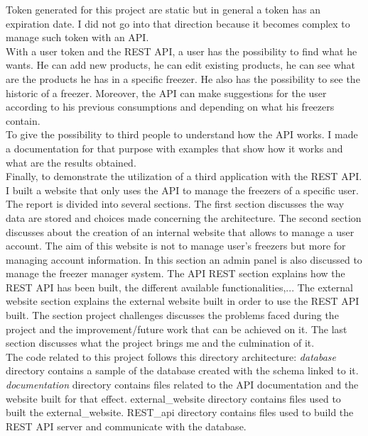 Token generated for this project are static but in general a token has an expiration date. I did not go into that direction because it becomes complex to manage such token with an API.\\

With a user token and the REST API, a user has the possibility to find what he wants. He can add new products, he can edit existing products, he can see what are the products he has in a specific freezer. He also has the possibility to see the historic of a freezer. Moreover, the API can make suggestions for the user according to his previous consumptions and depending on what his freezers contain.\\

To give the possibility to third people to understand how the API works. I made a documentation for that purpose with examples that show how it works and what are the results obtained. \\

Finally, to demonstrate the utilization of a third application with the REST API. I built a website that only uses the API to manage the freezers of a specific user.\\

The report is divided into several sections. The first section discusses the way data are stored and choices made concerning the architecture. The second section discusses about the creation of an internal website that allows to manage a user account. The aim of this website is not to manage user's freezers but more for managing account information. In this section an admin panel is also discussed to manage the freezer manager system. The API REST section explains how the REST API has been built, the different available functionalities,... The external website section explains the external website built in order to use the REST API built. The section project challenges discusses the problems faced during the project and the improvement/future work that can be achieved on it. The last section discusses what the project brings me and the culmination of it.\\

The code related to this project follows this directory architecture:
\textit{database} directory contains a sample of the database created with the schema linked to it. \textit{documentation} directory contains files related to the API documentation and the website built for that effect. external\_website directory contains files used to built the external\_website. REST\_api directory contains files used to build the REST API server and communicate with the database.

